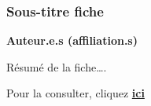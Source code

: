 \documentclass[
  11pt,
  a4paper,
]{article}
\makeatletter
\newcommand*\pandocbounded[1]{%
  \sbox\pandoc@box{#1}%
  \Gscale@div\@tempa{\textheight}{\dimexpr\ht\pandoc@box+\dp\pandoc@box\relax}%
  \Gscale@div\@tempb{\linewidth}{\wd\pandoc@box}%
  \ifdim\@tempb\p@<\@tempa\p@\let\@tempa\@tempb\fi%
  \ifdim\@tempa\p@<\p@\scalebox{\@tempa}{\usebox\pandoc@box}%
  \else\usebox{\pandoc@box}%
  \fi%
}
\makeatother
\begin{document}
\subsubsection{Sous-titre fiche}\label{sous-titre-fiche}

\textbf{Auteur.e.s (affiliation.s)}

Résumé de la fiche\ldots.

Pour la consulter, cliquez
\href{https://rzine.fr/docs/........./index.html}{\textbf{ici}}

\href{https://doi.org/10.48645/xxxx-xxxx}{\pandocbounded{}}
\href{http://creativecommons.org/licenses/by-sa/4.0/}{\pandocbounded{}}
\end{document}
